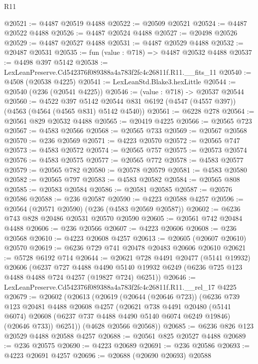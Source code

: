 \begin{lexlean}{R11}
\begin{coremodule}
@20521 := @4487 @20519 @4488
@20522 := @20509 @20521
@20524 := @4487 @20522 @4488
@20526 := @4487 @20524 @4488
@20527 := @20498 @20526
@20529 := @4487 @20527 @4488
@20531 := @4487 @20529 @4488
@20532 := @20487 @20531
@20535 := fun (value : @718) => @4487 @20532 @4488
@20537 := @4498 @397 @5142
@20538 := LexLeanPreserve.Cd542376f089388a4a783f2fc4c26811f.R11.__fits_11
@20540 := @4508 (@20538 @4225)
@20541 := LexLeanStd.Blake3.hexLittle
@20544 := @20540 (@236 (@20541 @4225))
@20546 := (value : @718) -> @20537 @20544
@20560 := @4522
    @397
    @5142
    @20544
    @831
    @6192
    (@4547 (@4557 @397))
    (@4563 (@4564 (@4565 @831) @5142 @4540))
@20561 := @6228 @278
@20564 := @20561 @829 @20532 @4488
@20565 := @20419 @4225
@20566 := @20565 @723
@20567 := @4583 @20566
@20568 := @20565 @733
@20569 := @20567 @20568
@20570 := @236 @20569
@20571 := @4223 @20570
@20572 := @20565 @747
@20573 := @4583 @20572
@20574 := @20565 @757
@20575 := @20573 @20574
@20576 := @4583 @20575
@20577 := @20565 @772
@20578 := @4583 @20577
@20579 := @20565 @782
@20580 := @20578 @20579
@20581 := @4583 @20580
@20582 := @20565 @797
@20583 := @4583 @20582
@20584 := @20565 @808
@20585 := @20583 @20584
@20586 := @20581 @20585
@20587 := @20576 @20586
@20588 := @236 @20587
@20590 := @4223 @20588 @4257
@20596 := @20564 (@20571 @20590) (@236 (@4583 @20569 @20587))
@20602 := @6236 @743 @828 @20486 @20531 @20570 @20590
@20605 := @20561 @742 @20484 @4488
@20606 := @236 @20566
@20607 := @4223 @20606
@20608 := @236 @20568
@20610 := @4223 @20608 @4257
@20613 := @20605 (@20607 @20610) @20570
@20619 := @6236 @729 @741 @20478 @20483 @20606 @20610
@20621 := @5728 @6192 @714
@20644 := @20621
    @728
    @4491
    @20477
    (@5141 @19932)
    @20606
    (@6237
      @727
      @4488
      @4490
      @5140
      @19932
      @6249
      (@6236 @725 @123 @4488 @4488 @724 @4257 (@19827 @724) @6251))
@20646 := LexLeanPreserve.Cd542376f089388a4a783f2fc4c26811f.R11.__rel_17 @4225
@20679 := @20602
    (@20613
      (@20619
        (@20644 (@20646 @723))
        (@6236
          @739
          @123
          @20481
          @4488
          @20608
          @4257
          (@20621
            @738
            @4491
            @20480
            (@5141 @6074)
            @20608
            (@6237 @737 @4488 @4490 @5140 @6074 @6249 @19846)
            (@20646 @733))
          @6251))
      (@4628 @20566 @20568))
@20685 := @6236 @826 @123 @20529 @4488 @20588 @4257
@20688 := @20561 @825 @20527 @4488
@20689 := @236 @20575
@20690 := @4223 @20689
@20691 := @236 @20586
@20693 := @4223 @20691 @4257
@20696 := @20688 (@20690 @20693) @20588

\end{coremodule}
\end{lexlean}
